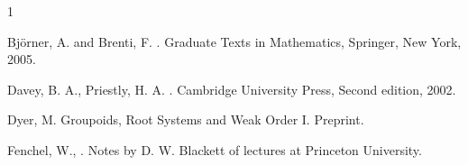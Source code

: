 \documentclass[psamsfonts]{amsart}
\numberwithin{equation}{subsection}
\theoremstyle{plain}
\theoremstyle{definition}
\theoremstyle{remark}
\begin{document}
\begin{thebibliography}{1}





 Bj{\"o}rner, A. and Brenti, F.
. 
\newblock Graduate Texts in Mathematics, Springer, New York,  2005.

 Davey, B. A., Priestly, H. A.
. 
\newblock Cambridge University Press, Second edition, 2002.

 Dyer, M.
\newblock Groupoids, Root Systems and Weak Order I.
\newblock Preprint.



Fenchel, W.,  
.
\newblock Notes by D. W. Blackett of lectures at Princeton University. 


\end{thebibliography}
\end{document}
